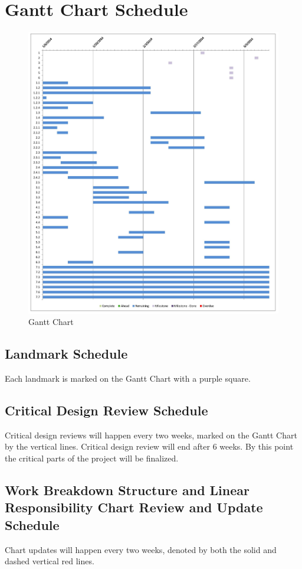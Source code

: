 \section{Gantt Chart Schedule}
\begin{figure}[H]
\centering
\includegraphics[width=1\textwidth]{gantt.jpg}
\caption{Gantt Chart}
\label{fig:Gantt Chart}
\end{figure}
\subsection{Landmark Schedule}
Each landmark is marked on the Gantt Chart with a purple square.
\subsection{Critical Design Review Schedule}
Critical design reviews will happen every two weeks, marked on the Gantt Chart by the vertical lines.
Critical design review will end after 6 weeks. By this point the critical parts of the project will be finalized. 
\subsection{Work Breakdown Structure and Linear Responsibility Chart Review and Update Schedule}
Chart updates will happen every two weeks, denoted by both the solid and dashed vertical red lines.

